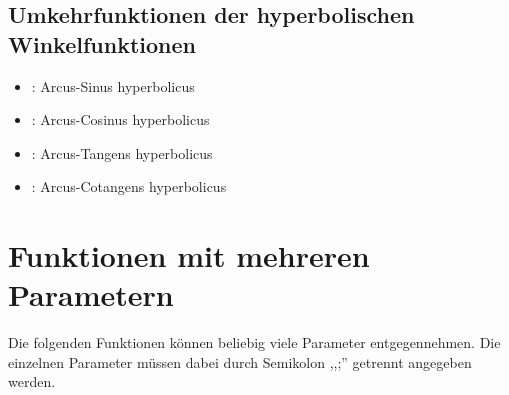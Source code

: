\section{Umkehrfunktionen der hyperbolischen Winkelfunktionen}

\begin{itemize}

\item
{}:
Arcus-Sinus hyperbolicus

\item
{}:
Arcus-Cosinus hyperbolicus

\item
{}:
Arcus-Tangens hyperbolicus

\item
{}:
Arcus-Cotangens hyperbolicus

\end{itemize}



\chapter{Funktionen mit mehreren Parametern}

Die folgenden Funktionen können beliebig viele Parameter entgegennehmen.
Die einzelnen Parameter müssen dabei durch Semikolon ,,;'' getrennt
angegeben werden.

